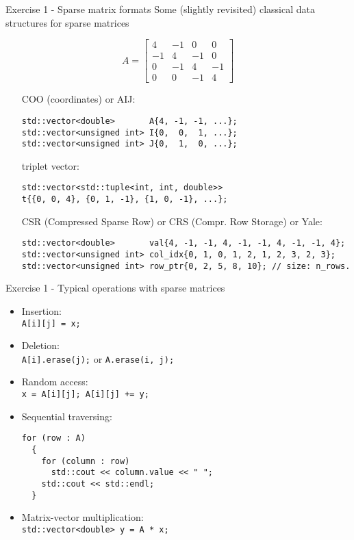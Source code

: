 \documentclass[10pt]{beamer}
\begin{document}
\begin{frame}[fragile]{Exercise 1 - Sparse matrix formats}
Some (slightly revisited) classical data structures for sparse matrices

\begin{equation*}
A = 
\begin{bmatrix}
4  & -1 & 0  & 0\\
-1 &  4 & -1 & 0\\
0  & -1 &  4 & -1\\
0  &  0 &  -1& 4
\end{bmatrix}
\end{equation*}

\begin{itemize}
\item [COO] (coordinates) or AIJ: \tiny
\begin{lstlisting}
std::vector<double>       A{4, -1, -1, ...};
std::vector<unsigned int> I{0,  0,  1, ...};
std::vector<unsigned int> J{0,  1,  0, ...};
\end{lstlisting} \normalsize
\item [triplet] vector:\tiny
\begin{lstlisting}
std::vector<std::tuple<int, int, double>> 
t{{0, 0, 4}, {0, 1, -1}, {1, 0, -1}, ...};
\end{lstlisting} \normalsize
\item [CSR] (Compressed Sparse Row) or CRS (Compr. Row Storage) or Yale:\tiny
\begin{lstlisting}
std::vector<double>       val{4, -1, -1, 4, -1, -1, 4, -1, -1, 4};
std::vector<unsigned int> col_idx{0, 1, 0, 1, 2, 1, 2, 3, 2, 3};
std::vector<unsigned int> row_ptr{0, 2, 5, 8, 10}; // size: n_rows.
\end{lstlisting} 
\end{itemize}
\end{frame}

\begin{frame}[fragile]{Exercise 1 - Typical operations with sparse matrices} 
\begin{itemize}
\item Insertion: \\
\lstinline|A[i][j] = x;|
\item Deletion: \\
\lstinline|A[i].erase(j);| or \lstinline|A.erase(i, j);|
\item Random access: \\
\lstinline|x = A[i][j]; A[i][j] += y;|
\item Sequential traversing:
\small\begin{lstlisting}
for (row : A)
  {
    for (column : row)
      std::cout << column.value << " ";
    std::cout << std::endl;
  }
\end{lstlisting}\normalsize
\item Matrix-vector multiplication:\\
\lstinline|std::vector<double> y = A * x;|
\end{itemize}
\end{frame}
\end{document}

